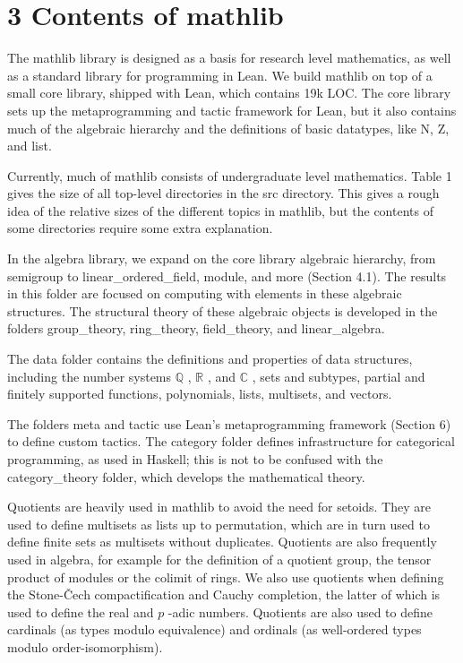 \documentclass[
]{article}
\begin{document}
\section{3 Contents of mathlib}\label{contents-of-mathlib}

The mathlib library is designed as a basis for research level
mathematics, as well as a standard library for programming in Lean. We
build mathlib on top of a small core library, shipped with Lean, which
contains 19k LOC. The core library sets up the metaprogramming and
tactic framework for Lean, but it also contains much of the algebraic
hierarchy and the definitions of basic datatypes, like N, Z, and list.

Currently, much of mathlib consists of undergraduate level mathematics.
Table 1 gives the size of all top-level directories in the src
directory. This gives a rough idea of the relative sizes of the
different topics in mathlib, but the contents of some directories
require some extra explanation.

In the algebra library, we expand on the core library algebraic
hierarchy, from semigroup to linear\_ordered\_field, module, and more
(Section 4.1). The results in this folder are focused on computing with
elements in these algebraic structures. The structural theory of these
algebraic objects is developed in the folders group\_theory,
ring\_theory, field\_theory, and linear\_algebra.

The data folder contains the definitions and properties of data
structures, including the number systems \(\mathbb{Q}\) , \(\mathbb{R}\)
, and \(\mathbb{C}\) , sets and subtypes, partial and finitely supported
functions, polynomials, lists, multisets, and vectors.

The folders meta and tactic use Lean's metaprogramming framework
(Section 6) to define custom tactics. The category folder defines
infrastructure for categorical programming, as used in Haskell; this is
not to be confused with the category\_theory folder, which develops the
mathematical theory.

Quotients are heavily used in mathlib to avoid the need for setoids.
They are used to define multisets as lists up to permutation, which are
in turn used to define finite sets as multisets without duplicates.
Quotients are also frequently used in algebra, for example for the
definition of a quotient group, the tensor product of modules or the
colimit of rings. We also use quotients when defining the Stone-Čech
compactification and Cauchy completion, the latter of which is used to
define the real and \(p\) -adic numbers. Quotients are also used to
define cardinals (as types modulo equivalence) and ordinals (as
well-ordered types modulo order-isomorphism).
\end{document}
